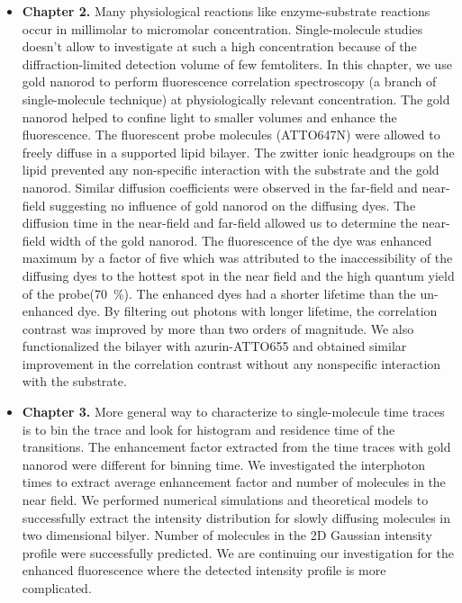\documentclass[11pt,a4paper,onecolumn]{article}
\begin{document}
\begin{itemize}
	\item \textbf{Chapter 2.} Many physiological reactions like enzyme-substrate reactions occur in millimolar to micromolar concentration. Single-molecule studies doesn't allow to investigate at such a high concentration because of the diffraction-limited detection volume of few femtoliters. In this chapter, we use gold nanorod to perform fluorescence correlation spectroscopy (a branch of single-molecule technique) at physiologically relevant concentration. The gold nanorod helped to confine light to smaller volumes and enhance the fluorescence. The fluorescent probe molecules (ATTO647N) were allowed to freely diffuse in a supported lipid bilayer. The zwitter ionic headgroups on the lipid prevented any non-specific interaction with the substrate and the gold nanorod. Similar diffusion coefficients were observed in the far-field and near-field suggesting no influence of gold nanorod on the diffusing dyes. The diffusion time in the near-field and far-field allowed us to determine the near-field width of the gold nanorod. The fluorescence of the dye was enhanced maximum by a factor of five which was attributed to the inaccessibility of the diffusing dyes to the hottest spot in the near field and the high quantum yield of the probe(\SI{70}{\percent}).
	The enhanced dyes had a shorter lifetime than the un-enhanced dye. By filtering out photons with longer lifetime, the correlation contrast was improved by more than two orders of magnitude. We also functionalized the bilayer with azurin-ATTO655 and obtained similar improvement in the correlation contrast without any nonspecific interaction with the substrate.

	\item \textbf{Chapter 3.} More general way to characterize to single-molecule time traces is to bin the trace and look for histogram and residence time of the transitions. The enhancement factor extracted from the time traces with gold nanorod were different for binning time. We investigated the interphoton times to extract average enhancement factor and number of molecules in the near field. We performed numerical simulations and theoretical models to successfully extract the intensity distribution for slowly diffusing molecules in two dimensional bilyer. Number of molecules in the 2D Gaussian intensity profile were successfully predicted. We are continuing our investigation for the enhanced fluorescence where the detected intensity profile is more complicated.
	

\end{itemize}
\end{document}
